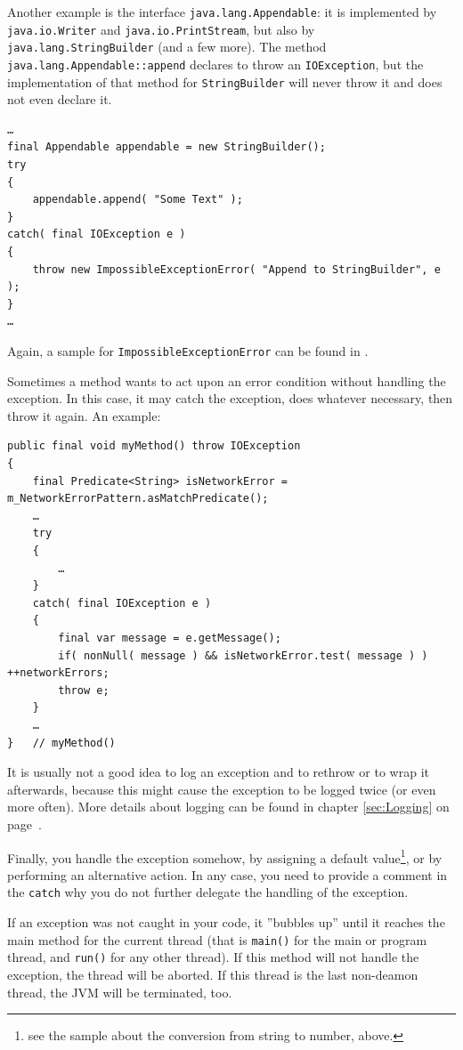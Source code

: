 \documentclass[11pt,a4paper, titlepage, parskip=half, headsepline, footsepline, cleardoublepage=current, headheight=1cm]{scrbook}
\newcommand*{\tqvref}[1]{\hyperref[{#1}]{\ref*{#1}} on page~\pageref{#1}}
\begin{document}
Another example is the interface \lstinline|java.lang.Appendable|\autocite{ORACLE_DOC_APPENDABLE_INTERFACE}: it is implemented by \lstinline|java.io.Writer| and \lstinline|java.io.PrintStream|, but also by \lstinline|java.lang.StringBuilder| (and a few more). The method \lstinline|java.lang.Appendable::append| declares to throw an \lstinline|IOException|, but the implementation of that method for \lstinline|StringBuilder| will never throw it and does not even declare it.
\begin{lstlisting}
…
final Appendable appendable = new StringBuilder();
try
{
    appendable.append( "Some Text" );
}
catch( final IOException e )
{
    throw new ImpossibleExceptionError( "Append to StringBuilder", e );
}
…
\end{lstlisting}

Again, a sample for \lstinline|ImpossibleExceptionError| can be found in \autocite{TQUADRAT_ORG_FOUNDATION_IMPOSSIBLEEXCEPTIONERROR}.

Sometimes a method wants to act upon an error condition without handling the exception. In this case, it may catch the exception, does whatever necessary, then throw it again. An example:
\begin{lstlisting}
public final void myMethod() throw IOException
{
    final Predicate<String> isNetworkError = m_NetworkErrorPattern.asMatchPredicate();
    …
    try
    {
        …
    }
    catch( final IOException e )
    {
        final var message = e.getMessage();
        if( nonNull( message ) && isNetworkError.test( message ) ) ++networkErrors;
        throw e;
    }
    …
}   // myMethod()
\end{lstlisting}

It is usually not a good idea to log an exception and to rethrow or to wrap it afterwards, because this might cause the exception to be logged twice (or even more often). More details about logging can be found in chapter \tqvref{sec:Logging}.

Finally, you handle the exception somehow, by assigning a default value\footnote{see the sample about the conversion from string to number, above.}, or by performing an alternative action. In any case, you need to provide a comment in the \lstinline|catch| why you do not further delegate the handling of the exception.

If an exception was not caught in your code, it ”bubbles up” until it reaches the main method for the current thread (that is \lstinline|main()| for the main or program thread, and \lstinline|run()|\autocite{ORACLE_DOC_RUNNABLE:run} for any other thread). If this method will not handle the exception, the thread will be aborted. If this thread is the last non-deamon thread, the JVM will be terminated, too.
\end{document}
